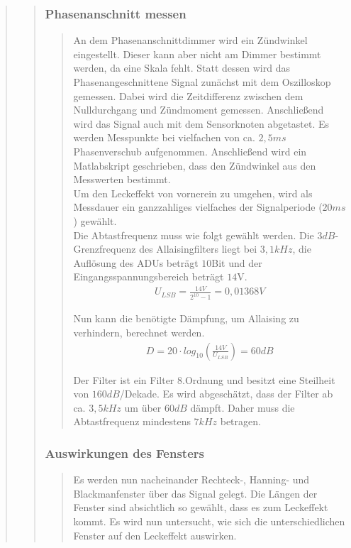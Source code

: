 \begin{quote}
\begin{quote}
		\subsubsection{Phasenanschnitt messen}
		\begin{quote}
		An dem Phasenanschnittdimmer wird ein Zündwinkel eingestellt. Dieser kann aber nicht am Dimmer 
		bestimmt werden, da eine Skala fehlt. Statt dessen wird das Phasenangeschnittene Signal zunächst 
		mit dem Oszilloskop gemessen. Dabei wird die Zeitdifferenz zwischen dem
		Nulldurchgang und Zündmoment gemessen. Anschließend wird das Signal auch mit dem Sensorknoten abgetastet.
		Es werden Messpunkte bei vielfachen von ca. $2,5ms$ Phasenverschub
		aufgenommen.
		Anschließend wird ein Matlabskript geschrieben, dass den Zündwinkel aus den Messwerten bestimmt.\\ 
		Um den Leckeffekt von vornerein zu umgehen, wird als Messdauer ein ganzzahliges vielfaches der 
		Signalperiode ($20ms$) gewählt.\\ 
		Die Abtastfrequenz muss wie folgt gewählt werden. Die $3dB$-Grenzfrequenz des
		Allaisingfilters liegt bei $3,1kHz$, die Auflösung des ADUs beträgt $10$Bit
		und der Eingangsspannungsbereich beträgt $14$V.\\
		
		\begin{align}
		U_{LSB} = \frac{14V}{2^{10}-1} = 0,01368V 
		\end{align} 
		
		Nun kann die benötigte Dämpfung, um Allaising zu verhindern, berechnet werden.\\
		
		\begin{align}
		D = 20 \cdot log_{10}(\frac{14V}{U_{LSB}}) = 60dB
		\end{align} 
		
		Der Filter ist ein Filter $8$.Ordnung und besitzt eine Steilheit von
		$160dB$/Dekade. Es wird abgeschätzt, dass der Filter ab ca. $3,5kHz$ um über
		$60dB$ dämpft. Daher muss die Abtastfrequenz mindestens $7kHz$ betragen.
		\end{quote}
		
		\subsubsection{Auswirkungen des Fensters}
		\begin{quote}
		Es werden nun nacheinander Rechteck-, Hanning- und Blackmanfenster über das Signal gelegt. 
		Die Längen der Fenster sind absichtlich so gewählt, dass es zum Leckeffekt kommt. 
		Es wird nun untersucht, wie sich die unterschiedlichen Fenster auf den Leckeffekt auswirken. 
		\end{quote}
		

\end{quote}
\end{quote}
